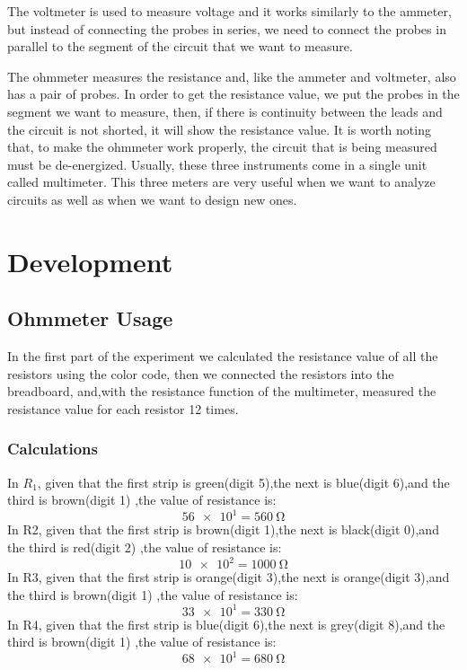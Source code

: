 \documentclass[a4paper]{article}
\begin{document}
The voltmeter is used to measure voltage and it works similarly to the ammeter, but instead of connecting the probes in series, we need to connect the probes in parallel to the segment of the circuit that we want to measure. 

The ohmmeter measures the resistance and, like the ammeter and voltmeter, also has a pair of probes. In order to get the resistance value, we put the probes in the segment we want to measure, then, if there is continuity between the leads and the circuit is not shorted, it will show the resistance value. It is worth noting that, to make the ohmmeter work properly, the circuit that is being measured must be de-energized. Usually, these three instruments come in a single unit called multimeter. This three meters are very useful when we want to analyze circuits as well as when we want to design new ones.

\newpage
\section{Development}
\subsection{Ohmmeter Usage}
In the first part of the experiment we calculated the resistance value of all the resistors using the color code, then we connected the resistors into the breadboard, and,with the resistance function of the multimeter, measured the resistance value for each resistor 12 times.
\subsubsection{Calculations}
In $R_1$, given that the first strip is green(digit 5),the next is blue(digit 6),and the third is brown(digit 1) ,the value of resistance is:
\[\SI{56e1}=\SI{560}{\ohm}\]
In R2, given that the first strip is brown(digit 1),the next is black(digit 0),and the third is red(digit 2) ,the value of resistance is:
\[\SI{10e2}=\SI{1000}{\ohm}\]
In R3, given that the first strip is orange(digit 3),the next is orange(digit 3),and the third is brown(digit 1) ,the value of resistance is:
\[\SI{33e1}=\SI{330}{\ohm}\]
In R4, given that the first strip is blue(digit 6),the next is grey(digit 8),and the third is brown(digit 1) ,the value of resistance is:
\[\SI{68e1}=\SI{680}{\ohm}\]
\end{document}
